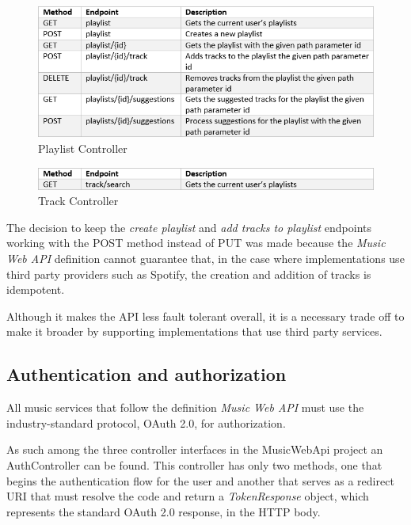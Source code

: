 \begin{figure}[!ht]
	\centering
	\includegraphics[width=1\textwidth,height=.20\textheight]{./Chapter3/Figures/MusicWebApi/PlaylistControllerTable.png}
	\caption{Playlist Controller}
	\label{fig:PlaylistControllerTable}
\end{figure}

\begin{figure}[!ht]
	\centering
	\includegraphics[width=1\textwidth,height=.025\textheight]{./Chapter3/Figures/MusicWebApi/TrackControllerTable.png}
	\caption{Track Controller}
	\label{fig:PlaylistControllerTable}
\end{figure}

The decision to keep the \textit{create playlist} and \textit{add tracks to playlist} endpoints working with the POST method instead of PUT was made because the \textit{Music Web API} definition cannot guarantee that, in the case where implementations use third party providers such as Spotify, the creation and addition of tracks is idempotent.

Although it makes the API less fault tolerant overall, it is a necessary trade off to make it broader by supporting implementations that use third party services.

\subsection{Authentication and authorization}
All music services that follow the definition \textit{Music Web API} must use the industry-standard protocol, OAuth 2.0, for authorization.

As such among the three controller interfaces in the MusicWebApi project an AuthController can be found. This controller has only two methods, one that begins the authentication flow for the user and another that serves as a redirect URI that must resolve the code and return a \textit{TokenResponse} object, which represents the standard OAuth 2.0 response, in the HTTP body.


